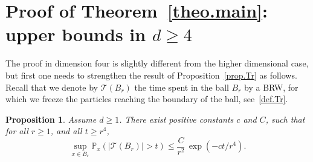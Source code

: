 \documentclass[11pt]{article}
\numberwithin{equation}{section}
\theoremstyle{plain}
\newtheorem{proposition}[theorem]{Proposition}
\theoremstyle{definition}
\newcommand{\1}{{\text{\Large $\mathfrak 1$}}}
\begin{document}
\section{Proof of Theorem~\ref{theo.main}: upper bounds in \texorpdfstring{$d\ge 4$}{d4}}
\label{sec-UB4}

The proof in dimension four is slightly different from
the higher dimensional case, but first one needs
to strengthen the result of Proposition~\ref{prop.Tr} as follows.
Recall that we denote by $\mathcal T(B_r)$ the time spent in the ball $B_r$
by a BRW,
for which we freeze the particles reaching the
boundary of the ball, see~\eqref{def.Tr}.
\begin{proposition}\label{prop.Tr+}
Assume $d\ge 1$.
There exist positive constants $c$ and $C$, such that for all $r\ge 1$, and all $t\ge r^4$,\vspace*{-3pt}
\[
\sup_{x\in B_r} \mathbb P_x (|\mathcal T(B_r)|>t) \le \frac{C}{r^2}\, \exp(-ct/r^4).
\]
\end{proposition}
\end{document}
